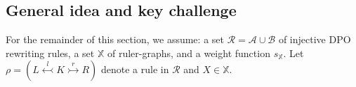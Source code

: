 



\subsection{General idea and key challenge}
\label{sec:general_idea}
For the remainder of this section, we assume: a set \( \mathcal{R} = \mathcal{A} \cup \mathcal{B} \) of injective DPO rewriting rules, a set \( \mathbb{X} \) of ruler-graphs, and a weight function \( s_{\mathbb{X}} \).  Let \( \rho = (L \overset{l}{\leftarrowtail} K \overset{r}{\rightarrowtail} R) \) denote a rule in \( \mathcal{R} \) and \( X \in \mathbb{X} \).

